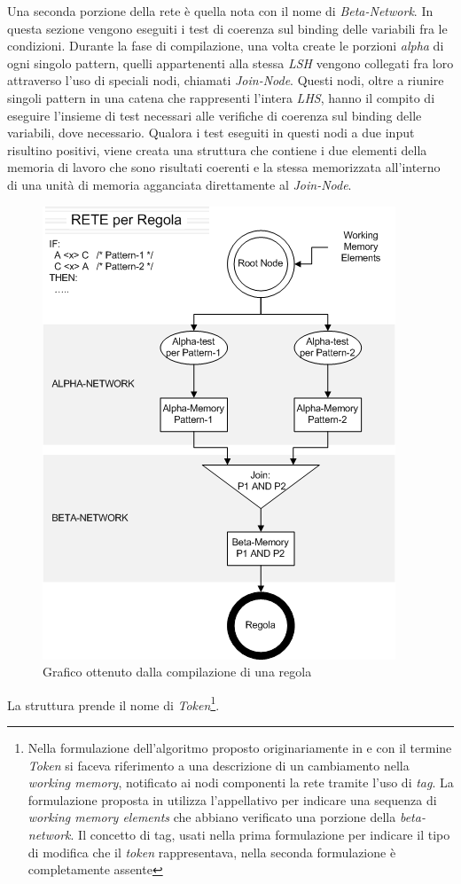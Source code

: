 Una seconda porzione della rete è quella nota con il nome di \emph{Beta-Network}. In questa sezione vengono eseguiti i test di coerenza sul binding delle variabili fra le condizioni. Durante la fase di compilazione, una volta create le porzioni \emph{alpha} di ogni singolo pattern, quelli appartenenti alla stessa \emph{LSH} vengono collegati fra loro attraverso l'uso di speciali nodi, chiamati \emph{Join-Node}. Questi nodi, oltre a riunire singoli pattern in una catena che rappresenti l'intera \emph{LHS}, hanno il compito di eseguire l'insieme di test necessari alle verifiche di coerenza sul binding delle variabili, dove necessario. Qualora i test eseguiti in questi nodi a due input risultino positivi, viene creata una struttura che contiene i due elementi della memoria di lavoro che sono risultati coerenti e la stessa memorizzata all'interno di una unità di memoria agganciata direttamente al \emph{Join-Node}. 

\begin{figure}
\centering
\includegraphics[scale=0.7]{Immagini/Capitolo1/grafico-regola-rete.png}
\caption{Grafico ottenuto dalla compilazione di una regola}\label{fig:grafico-regola}
\end{figure}


La struttura prende il nome di \emph{Token}\footnote{Nella formulazione dell'algoritmo proposto originariamente in \cite{forgy1979} e \cite{forgy1982} con il termine \emph{Token} si faceva riferimento a una descrizione di un cambiamento nella \emph{working memory}, notificato ai nodi componenti la rete tramite l'uso di \emph{tag}. La formulazione proposta in \cite{Doorenbos95productionmatching} utilizza l'appellativo per indicare una sequenza di \emph{working memory elements} che abbiano verificato una porzione della \emph{beta-network}. Il concetto di tag, usati nella prima formulazione per indicare il tipo di modifica che il \emph{token} rappresentava, nella seconda formulazione è completamente assente}.

